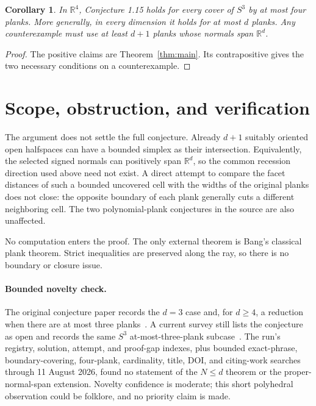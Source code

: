 \documentclass[11pt]{article}
\newtheorem{corollary}[theorem]{Corollary}
\newcommand{\R}{\mathbb R}
\begin{document}
\begin{corollary}\label{cor:four}
In $\R^4$, Conjecture 1.15 holds for every cover of $S^3$ by at most four
planks.  More generally, in every dimension it holds for at most $d$ planks.
Any counterexample must use at least $d+1$ planks whose normals span $\R^d$.
\end{corollary}

\begin{proof}
The positive claims are Theorem~\ref{thm:main}.  Its contrapositive gives the
two necessary conditions on a counterexample.
\end{proof}

\section{Scope, obstruction, and verification}

The argument does not settle the full conjecture.  Already $d+1$ suitably
oriented open halfspaces can have a bounded simplex as their intersection.
Equivalently, the selected signed normals can positively span $\R^d$, so the
common recession direction used above need not exist.  A direct attempt to
compare the facet distances of such a bounded uncovered cell with the widths
of the original planks does not close: the opposite boundary of each plank
generally cuts a different neighboring cell.  The two polynomial-plank
conjectures in the source are also unaffected.

No computation enters the proof.  The only external theorem is Bang's
classical plank theorem.  Strict inequalities are preserved along the ray, so
there is no boundary or closure issue.

\paragraph{Bounded novelty check.}
The original conjecture paper records the $d=3$ case and, for $d\ge4$, a
reduction when there are at most three planks~\cite[Remark after Conjecture
1.17]{GKPcovering}.  A current survey still lists the conjecture as open and
records the same $S^3$ at-most-three-plank subcase~\cite{Verreault}.  The run's
registry, solution, attempt, and proof-gap indexes, plus bounded exact-phrase,
boundary-covering, four-plank, cardinality, title, DOI, and citing-work
searches through 11 August 2026, found no statement of the $N\le d$ theorem or
the proper-normal-span extension.  Novelty confidence is moderate; this short
polyhedral observation could be folklore, and no priority claim is made.
\end{document}
